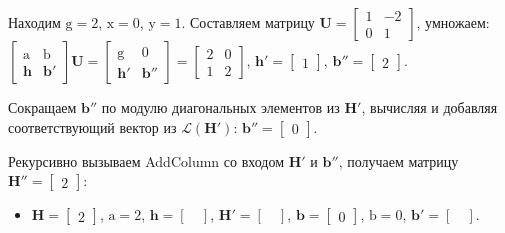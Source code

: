 \begin{enumerate}
Находим $ \mathrm{g} = 2 $, $ \mathrm{x} = 0 $, $ \mathrm{y} = 1 $. Составляем матрицу $  \mathbf{U} = \left[\begin{array}{cccc}
1 & -2 \\
0 & 1
\end{array}\right] $, умножаем: $ \left[ \begin{array}{cccc}
\mathrm{a} & \mathrm{b} \\
\mathbf{h} & \mathbf{b}' \end{array} \right] \mathbf{U}=
\left[ \begin{array}{cccc}
\mathrm{g} & \mathrm{0} \\
\mathbf{h}' & \mathbf{b}'' \end{array} \right] = \left[\begin{array}{cccc}
2 & 0 \\
1 & 2
\end{array}\right] $, $ \mathbf{h}' = \left[\begin{array}{cccc}
1
\end{array}\right] $, $ \mathbf{b}'' = \left[\begin{array}{cccc}
2
\end{array}\right] $.

Сокращаем $ \mathbf{b}'' $ по модулю диагональных элементов из $ \mathbf{H}' $, вычисляя и добавляя соответствующий вектор из $ \mathcal{L}(\mathbf{H}') $: $ \mathbf{b}'' = \left[ \begin{array}{cccc}
0
\end{array}\right] $.

Рекурсивно вызываем AddColumn со входом $ \mathbf{H}' $ и $ \mathbf{b}'' $, получаем матрицу $ \mathbf{H}'' = \left[\begin{array}{cccc}
2
\end{array}\right] $:
\begin{itemize}
\item $ \mathbf{H} = \left[\begin{array}{cccc}
2
\end{array}\right] $, $ \mathrm{a} = 2 $, $ \mathbf{h} = \left[\begin{array}{cccc}
\ \end{array}\right] $, $ \mathbf{H}' = \left[ \begin{array}{cccc}
\ \end{array}\right] $, $ \mathbf{b} = \left[\begin{array}{cccc}
0
\end{array}\right] $, $ \mathrm{b} = 0 $, $ \mathbf{b}' = \left[ \begin{array}{cccc}
\ \end{array}\right] $.


\end{itemize}
\end{enumerate}
